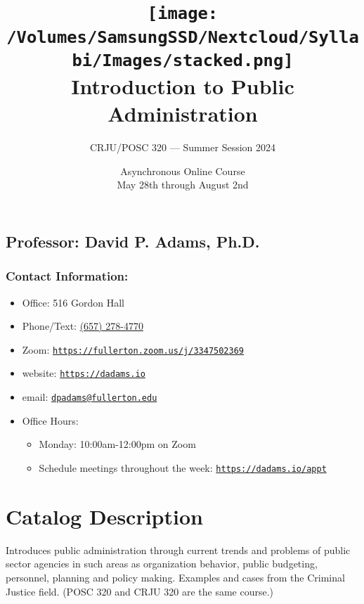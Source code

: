 \documentclass[12pt, letterpaper]{article}
\begin{document}
\title{\texttt{[image: /Volumes/SamsungSSD/Nextcloud/Syllabi/Images/stacked.png]} \\ \textbf{Introduction to Public Administration}}

\author{CRJU/POSC 320 — Summer Session 2024}
\date{Asynchronous Online Course \\ May 28th through August 2nd}

    \maketitle


\subsection*{Professor: David P. Adams, Ph.D.}

\subsubsection*{Contact Information:}


\begin{itemize}
	\item Office: 516 Gordon Hall
	\item Phone/Text: \href{tel:+16572784770}{(657) 278-4770}
	\item Zoom: \href{https://fullerton.zoom.us/j/3347502369}{\texttt{https://fullerton.zoom.us/j/3347502369}}
	\item website: \href{https://dadams.io}{\texttt{https://dadams.io}}
	\item email: \href{dpadams@fullerton.edu}{\texttt{dpadams@fullerton.edu}}
	\item Office Hours:
        \begin{itemize}
            \item Monday: 10:00am-12:00pm on Zoom
            \item Schedule meetings throughout the week: \href{https://dadams.io/appt}{\texttt{https://dadams.io/appt}}
        \end{itemize}  
\end{itemize}


\section{Catalog Description}

Introduces public administration through current trends and problems of public sector agencies in such areas as organization behavior, public budgeting, personnel, planning and policy making. Examples and cases from the Criminal Justice field. (POSC 320 and CRJU 320 are the same course.)
\end{document}
